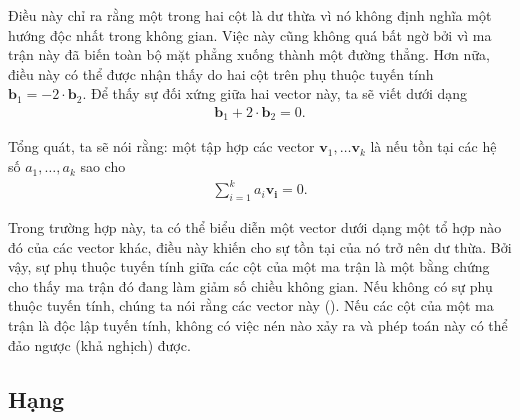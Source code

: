 \documentclass[letterpaper,11pt,english]{sphinxmanual}
\begin{document}
Điều này chỉ ra rằng một trong hai cột là dư thừa vì nó không định nghĩa
một hướng độc nhất trong không gian. Việc này cũng không quá bất ngờ bởi
vì ma trận này đã biến toàn bộ mặt phẳng xuống thành một đường thẳng.
Hơn nữa, điều này có thể được nhận thấy do hai cột trên phụ thuộc tuyến
tính \(\mathbf{b}_1 = -2\cdot\mathbf{b}_2\). Để thấy sự đối xứng
giữa hai vector này, ta sẽ viết dưới dạng
\begin{equation}\label{equation:chapter_appendix_math/geometry-linear-algebric-ops_vn:chapter_appendix_math/geometry-linear-algebric-ops_vn:14}
\begin{split}\mathbf{b}_1  + 2\cdot\mathbf{b}_2 = 0.\end{split}
\end{equation}


Tổng quát, ta sẽ nói rằng: một tập hợp các vector
\(\mathbf{v}_1, \ldots \mathbf{v}_k\) là  nếu
tồn tại các hệ số \(a_1, \ldots, a_k\) 
sao cho
\begin{equation}\label{equation:chapter_appendix_math/geometry-linear-algebric-ops_vn:chapter_appendix_math/geometry-linear-algebric-ops_vn:15}
\begin{split}\sum_{i=1}^k a_i\mathbf{v_i} = 0.\end{split}
\end{equation}


Trong trường hợp này, ta có thể biểu diễn một vector dưới dạng một tổ
hợp nào đó của các vector khác, điều này khiến cho sự tồn tại của nó trở
nên dư thừa. Bởi vậy, sự phụ thuộc tuyến tính giữa các cột của một ma
trận là một bằng chứng cho thấy ma trận đó đang làm giảm số chiều không
gian. Nếu không có sự phụ thuộc tuyến tính, chúng ta nói rằng các vector
này  (). Nếu các cột của một
ma trận là độc lập tuyến tính, không có việc nén nào xảy ra và phép toán
này có thể đảo ngược (khả nghịch) được.








\subsection{Hạng}
\label{\detokenize{chapter_appendix_math/geometry-linear-algebric-ops_vn:hang}}
\end{document}
